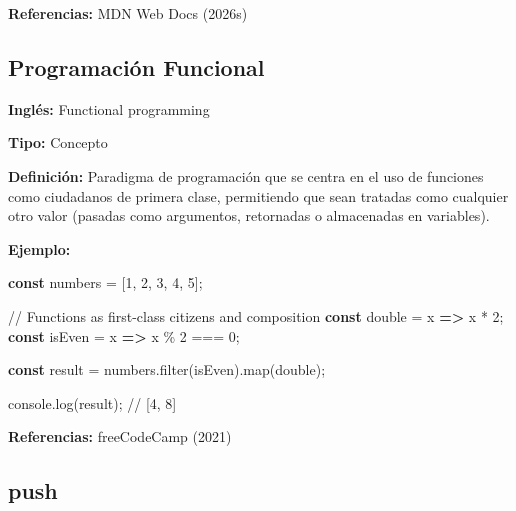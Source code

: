 \documentclass[
  letterpaper,
  DIV=11,
  numbers=noendperiod]{scrreprt}
\newenvironment{Shaded}{\begin{snugshade}}{\end{snugshade}}
\newcommand{\BuiltInTok}[1]{\textcolor[rgb]{0.00,0.23,0.31}{#1}}
\newcommand{\CommentTok}[1]{\textcolor[rgb]{0.37,0.37,0.37}{#1}}
\newcommand{\DecValTok}[1]{\textcolor[rgb]{0.68,0.00,0.00}{#1}}
\newcommand{\FunctionTok}[1]{\textcolor[rgb]{0.28,0.35,0.67}{#1}}
\newcommand{\KeywordTok}[1]{\textcolor[rgb]{0.00,0.23,0.31}{\textbf{#1}}}
\newcommand{\NormalTok}[1]{\textcolor[rgb]{0.00,0.23,0.31}{#1}}
\newcommand{\OperatorTok}[1]{\textcolor[rgb]{0.37,0.37,0.37}{#1}}
\let\oldsubsection\subsection
\renewcommand{\subsection}{\phantomsection\oldsubsection}
\begin{document}
\textbf{Referencias:} MDN Web Docs (2026s)

\subsection*{Programación Funcional}\label{glos-programacion_funcional}

\textbf{Inglés:} Functional programming

\textbf{Tipo:} Concepto

\textbf{Definición:} Paradigma de programación que se centra en el uso
de funciones como ciudadanos de primera clase, permitiendo que sean
tratadas como cualquier otro valor (pasadas como argumentos, retornadas
o almacenadas en variables).

\textbf{Ejemplo:}

\begin{Shaded}
\begin{Highlighting}[]
\KeywordTok{const}\NormalTok{ numbers }\OperatorTok{=}\NormalTok{ [}\DecValTok{1}\OperatorTok{,} \DecValTok{2}\OperatorTok{,} \DecValTok{3}\OperatorTok{,} \DecValTok{4}\OperatorTok{,} \DecValTok{5}\NormalTok{]}\OperatorTok{;}

\CommentTok{// Functions as first{-}class citizens and composition}
\KeywordTok{const}\NormalTok{ double }\OperatorTok{=}\NormalTok{ x }\KeywordTok{=\textgreater{}}\NormalTok{ x }\OperatorTok{*} \DecValTok{2}\OperatorTok{;}
\KeywordTok{const}\NormalTok{ isEven }\OperatorTok{=}\NormalTok{ x }\KeywordTok{=\textgreater{}}\NormalTok{ x }\OperatorTok{\%} \DecValTok{2} \OperatorTok{===} \DecValTok{0}\OperatorTok{;}

\KeywordTok{const}\NormalTok{ result }\OperatorTok{=}\NormalTok{ numbers}\OperatorTok{.}\FunctionTok{filter}\NormalTok{(isEven)}\OperatorTok{.}\FunctionTok{map}\NormalTok{(double)}\OperatorTok{;}

\BuiltInTok{console}\OperatorTok{.}\FunctionTok{log}\NormalTok{(result)}\OperatorTok{;} \CommentTok{// [4, 8]}
\end{Highlighting}
\end{Shaded}

\textbf{Referencias:} freeCodeCamp (2021)

\subsection*{push}\label{glos-push}
\end{document}
